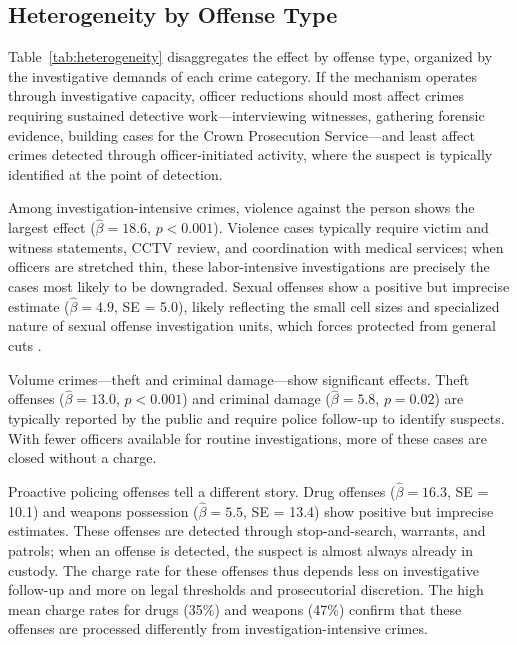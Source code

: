 \documentclass[12pt]{article}
\begin{document}
\subsection{Heterogeneity by Offense Type}



Table~\ref{tab:heterogeneity} disaggregates the effect by offense type, organized by the investigative demands of each crime category. If the mechanism operates through investigative capacity, officer reductions should most affect crimes requiring sustained detective work---interviewing witnesses, gathering forensic evidence, building cases for the Crown Prosecution Service---and least affect crimes detected through officer-initiated activity, where the suspect is typically identified at the point of detection.

Among investigation-intensive crimes, violence against the person shows the largest effect ($\hat{\beta} = 18.6$, $p < 0.001$). Violence cases typically require victim and witness statements, CCTV review, and coordination with medical services; when officers are stretched thin, these labor-intensive investigations are precisely the cases most likely to be downgraded. Sexual offenses show a positive but imprecise estimate ($\hat{\beta} = 4.9$, SE = 5.0), likely reflecting the small cell sizes and specialized nature of sexual offense investigation units, which forces protected from general cuts \citep{hmic2017}.

Volume crimes---theft and criminal damage---show significant effects. Theft offenses ($\hat{\beta} = 13.0$, $p < 0.001$) and criminal damage ($\hat{\beta} = 5.8$, $p = 0.02$) are typically reported by the public and require police follow-up to identify suspects. With fewer officers available for routine investigations, more of these cases are closed without a charge.

Proactive policing offenses tell a different story. Drug offenses ($\hat{\beta} = 16.3$, SE = 10.1) and weapons possession ($\hat{\beta} = 5.5$, SE = 13.4) show positive but imprecise estimates. These offenses are detected through stop-and-search, warrants, and patrols; when an offense is detected, the suspect is almost always already in custody. The charge rate for these offenses thus depends less on investigative follow-up and more on legal thresholds and prosecutorial discretion. The high mean charge rates for drugs (35\%) and weapons (47\%) confirm that these offenses are processed differently from investigation-intensive crimes.
\end{document}

